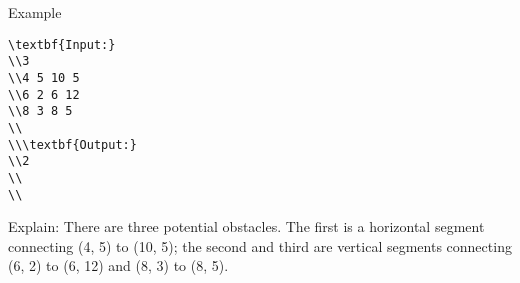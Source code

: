 Example
\begin{verbatim}
\textbf{Input:}
\\3 
\\4 5 10 5 
\\6 2 6 12 
\\8 3 8 5 
\\
\\\textbf{Output:}
\\2
\\
\\\end{verbatim}

   Explain:       There are three potential obstacles. The first is a horizontal segment connecting (4, 5) to (10, 5); the second and third are vertical segments connecting (6, 2) to (6, 12) and (8, 3) to (8, 5).